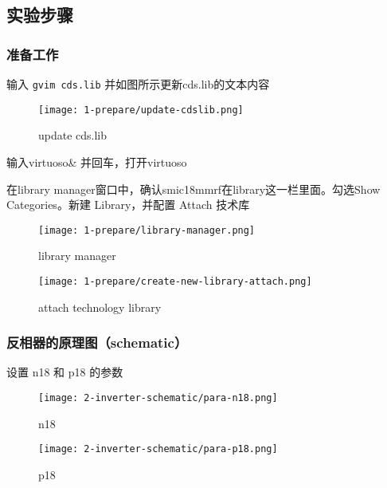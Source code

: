 \documentclass{theme-2614084}
\begin{document}
\subsection{实验步骤}

\subsubsection{准备工作}

输入 \texttt{gvim cds.lib} 并如图所示更新cds.lib的文本内容

\begin{figure}[H]
  \centering
  \texttt{[image: 1-prepare/update-cdslib.png]}
  \caption{update cds.lib}
\end{figure}

输入virtuoso\& 并回车，打开virtuoso

在library manager窗口中，确认smic18mmrf在library这一栏里面。勾选Show Categories。新建 Library，并配置 Attach 技术库

\begin{figure}[htbp]
  \centering\begin{minipage}[t]{0.48\textwidth}
      \centering\texttt{[image: 1-prepare/library-manager.png]}
      \caption{library manager}
  \end{minipage}
  \centering\begin{minipage}[t]{0.48\textwidth}
      \centering\texttt{[image: 1-prepare/create-new-library-attach.png]}
      \caption{attach technology library}
  \end{minipage}
\end{figure}

\subsubsection{反相器的原理图（schematic）}

设置 n18 和 p18 的参数

\begin{figure}[htbp]
  \centering\begin{minipage}[t]{0.48\textwidth}
      \centering\texttt{[image: 2-inverter-schematic/para-n18.png]}
      \caption{n18}
  \end{minipage}
  \centering\begin{minipage}[t]{0.48\textwidth}
      \centering\texttt{[image: 2-inverter-schematic/para-p18.png]}
      \caption{p18}
  \end{minipage}
\end{figure}
\end{document}
